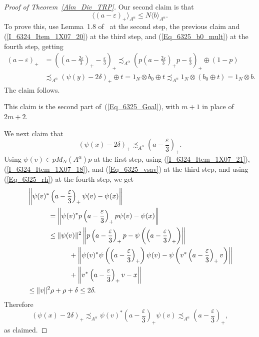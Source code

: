 \documentclass[10pt]{amsart}
\numberwithin{equation}{section}
\theoremstyle{definition}
\newcommand{\af}{\alpha}
\newcommand{\dt}{\delta}
\newcommand{\ep}{\varepsilon}
\newcommand{\ps}{\psi}
\newcommand{\rh}{\rho}
\newcommand{\cc}[1]{\langle #1 \rangle}
\begin{document}
\begin{proof}[Proof of Theorem~\ref{Alm_Div_TRP}]
Our second claim is that
%
\begin{equation}\label{Eq_6325_bsub}
\cc{(a - \ep)_{+}}_{A^{\alpha}} \leq N \cc{b}_{A^{\alpha}}.
\end{equation}
%
To prove this, use Lemma~1.8 of~\cite{Phl40} at the second step,
the previous claim and (\ref{I_6324_Item_1X07_20}) at the third step,
and (\ref{Eq_6325_b0_mult}) at the fourth step,
getting
\[
\begin{split}
(a - \ep)_{+}
& = \left( \left( a - \frac{2 \ep}{3} \right)_+ - \frac{\ep}{3} \right)_+
  \precsim_{A^{\af}}
 \left( p \left( a - \frac{2 \ep}{3} \right)_+ p - \frac{\ep}{3} \right)_+
 \oplus (1 - p)
\\
& \precsim_{A^{\af}} (\ps (y) - 2 \dt)_{+} \oplus t
  = 1_{N} \otimes b_0 \oplus t
  \precsim_{A^{\af}} 1_{N} \otimes (b_0 \oplus t)
  = 1_{N} \otimes b.
\end{split}
\]
The claim follows.

This claim is the second part of~(\ref{Eq_6325_Goal}),
with $m + 1$ in place of $2 m + 2$.

We next claim that
%
\begin{equation}\label{Eq_6325_xsubb}
(\ps (x) - 2 \dt)_{+} \precsim_{A^{\af}} \left( a - \frac{\ep}{3} \right)_+.
\end{equation}
%
Using $\ps (v) \in p M_N (A^{\af}) p$ at the first step,
using (\ref{I_6324_Item_1X07_21}), (\ref{I_6324_Item_1X07_18}),
and (\ref{Eq_6325_vsav}) at the third step,
and using (\ref{Eq_6325_rh}) at the fourth step,
we get
\[
\begin{split}
& \left\| \ps (v)^* \left( a - \frac{\ep}{3} \right)_+ \ps (v)
    - \ps (x) \right\|
\\
& \hspace*{3em} {\mbox{}}
 = \left\| \ps (v)^* p \left( a - \frac{\ep}{3} \right)_+ p \ps (v)
    - \ps (x) \right\|
\\
& \hspace*{3em} {\mbox{}} \leq \| \ps (v) \|^2
  \left\| p \left( a - \frac{\ep}{3} \right)_+ p
    - \ps \left( \left( a - \frac{\ep}{3} \right)_+ \right) \right\|
\\
& \hspace*{6em} {\mbox{}}
  + \left\|
    \ps (v)^* \ps \left( \left( a - \frac{\ep}{3} \right)_+ \right) \ps (v)
    - \ps \left( v^* \left( a - \frac{\ep}{3} \right)_+ v \right) \right\|
\\
& \hspace*{6em} {\mbox{}}
  + \left\| v^* \left( a - \frac{\ep}{3} \right)_+ v - x \right\|
\\
& \leq \| v \|^2 \rh + \rh + \dt \leq 2 \dt.
\end{split}
\]
Therefore
\[
( \ps (x) - 2 \dt)_{+}
 \precsim_{A^{\af}} \ps (v)^* \left( a - \frac{\ep}{3} \right)_+ \ps (v)
 \precsim_{A^{\af}} \left( a - \frac{\ep}{3} \right)_+,
\]
as claimed.


\end{proof}
\end{document}
